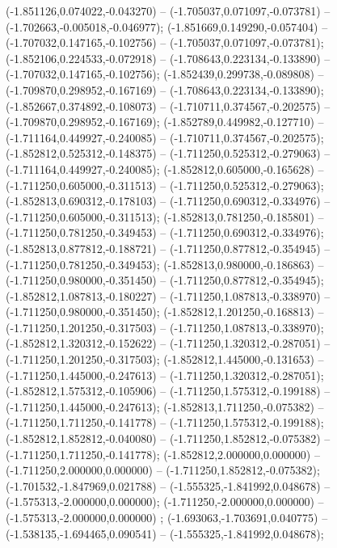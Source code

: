  (-1.851126,0.074022,-0.043270) -- (-1.705037,0.071097,-0.073781) -- (-1.702663,-0.005018,-0.046977);
 (-1.851669,0.149290,-0.057404) -- (-1.707032,0.147165,-0.102756) -- (-1.705037,0.071097,-0.073781);
 (-1.852106,0.224533,-0.072918) -- (-1.708643,0.223134,-0.133890) -- (-1.707032,0.147165,-0.102756);
 (-1.852439,0.299738,-0.089808) -- (-1.709870,0.298952,-0.167169) -- (-1.708643,0.223134,-0.133890);
 (-1.852667,0.374892,-0.108073) -- (-1.710711,0.374567,-0.202575) -- (-1.709870,0.298952,-0.167169);
 (-1.852789,0.449982,-0.127710) -- (-1.711164,0.449927,-0.240085) -- (-1.710711,0.374567,-0.202575);
 (-1.852812,0.525312,-0.148375) -- (-1.711250,0.525312,-0.279063) -- (-1.711164,0.449927,-0.240085);
 (-1.852812,0.605000,-0.165628) -- (-1.711250,0.605000,-0.311513) -- (-1.711250,0.525312,-0.279063);
 (-1.852813,0.690312,-0.178103) -- (-1.711250,0.690312,-0.334976) -- (-1.711250,0.605000,-0.311513);
 (-1.852813,0.781250,-0.185801) -- (-1.711250,0.781250,-0.349453) -- (-1.711250,0.690312,-0.334976);
 (-1.852813,0.877812,-0.188721) -- (-1.711250,0.877812,-0.354945) -- (-1.711250,0.781250,-0.349453);
 (-1.852813,0.980000,-0.186863) -- (-1.711250,0.980000,-0.351450) -- (-1.711250,0.877812,-0.354945);
 (-1.852812,1.087813,-0.180227) -- (-1.711250,1.087813,-0.338970) -- (-1.711250,0.980000,-0.351450);
 (-1.852812,1.201250,-0.168813) -- (-1.711250,1.201250,-0.317503) -- (-1.711250,1.087813,-0.338970);
 (-1.852812,1.320312,-0.152622) -- (-1.711250,1.320312,-0.287051) -- (-1.711250,1.201250,-0.317503);
 (-1.852812,1.445000,-0.131653) -- (-1.711250,1.445000,-0.247613) -- (-1.711250,1.320312,-0.287051);
 (-1.852812,1.575312,-0.105906) -- (-1.711250,1.575312,-0.199188) -- (-1.711250,1.445000,-0.247613);
 (-1.852813,1.711250,-0.075382) -- (-1.711250,1.711250,-0.141778) -- (-1.711250,1.575312,-0.199188);
 (-1.852812,1.852812,-0.040080) -- (-1.711250,1.852812,-0.075382) -- (-1.711250,1.711250,-0.141778);
 (-1.852812,2.000000,0.000000) -- (-1.711250,2.000000,0.000000) -- (-1.711250,1.852812,-0.075382);
 (-1.701532,-1.847969,0.021788) -- (-1.555325,-1.841992,0.048678) -- (-1.575313,-2.000000,0.000000);
 (-1.711250,-2.000000,0.000000) -- (-1.575313,-2.000000,0.000000) ;
 (-1.693063,-1.703691,0.040775) -- (-1.538135,-1.694465,0.090541) -- (-1.555325,-1.841992,0.048678);
